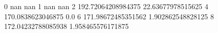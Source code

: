 0 nan nan
1 nan nan
2 192.72064208984375 22.63677978515625
4 170.0838623046875 0.0
6 171.98672485351562 1.902862548828125
8 172.04232788085938 1.958465576171875
